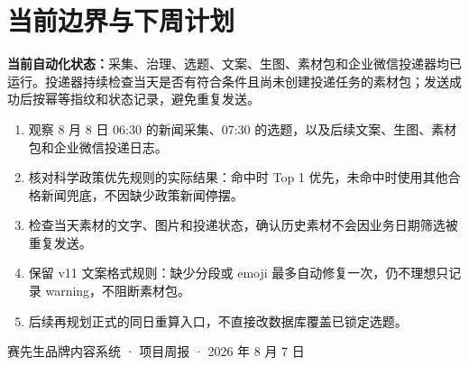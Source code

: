 \documentclass[UTF8,11pt,a4paper,fontset=none]{ctexart}
\begin{document}
\section{当前边界与下周计划}

\begin{riskbox}
\textbf{当前自动化状态：}采集、治理、选题、文案、生图、素材包和企业微信投递器均已运行。投递器持续检查当天是否有符合条件且尚未创建投递任务的素材包；发送成功后按幂等指纹和状态记录，避免重复发送。
\end{riskbox}

\begin{enumerate}[leftmargin=2em,itemsep=0.28em]
  \item 观察 8 月 8 日 06:30 的新闻采集、07:30 的选题，以及后续文案、生图、素材包和企业微信投递日志。
  \item 核对科学政策优先规则的实际结果：命中时 Top 1 优先，未命中时使用其他合格新闻兜底，不因缺少政策新闻停摆。
  \item 检查当天素材的文字、图片和投递状态，确认历史素材不会因业务日期筛选被重复发送。
  \item 保留 v11 文案格式规则：缺少分段或 emoji 最多自动修复一次，仍不理想只记录 warning，不阻断素材包。
  \item 后续再规划正式的同日重算入口，不直接改数据库覆盖已锁定选题。
\end{enumerate}

\vfill
\begin{center}
\small\sffamily\color{muted}
赛先生品牌内容系统 · 项目周报 · 2026 年 8 月 7 日
\end{center}
\end{document}
